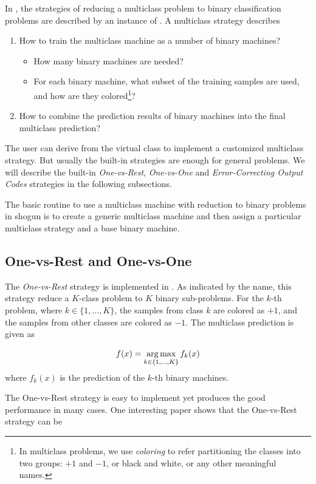 In \shogun{}, the strategies of reducing a multiclass problem to binary
classification problems are described by an instance of
. A multiclass strategy describes
\begin{enumerate}
\item How to train the multiclass machine as a number of binary machines?
	\begin{itemize}
		\item How many binary machines are needed?
		\item For each binary machine, what subset of the training samples are
			used, and how are they colored\footnote{In multiclass problems, we
				use \emph{coloring} to refer partitioning the classes into two
				groups: $+1$ and $-1$, or black and white, or any other meaningful
				names.}?
	\end{itemize}
\item How to combine the prediction results of binary machines into the final
	multiclass prediction?
\end{enumerate}

The user can derive from the virtual class  to
implement a customized multiclass strategy. But usually the built-in strategies
are enough for general problems. We will describe the built-in \emph{One-vs-Rest},
\emph{One-vs-One} and \emph{Error-Correcting Output Codes} strategies in the
following subsections.

The basic routine to use a multiclass machine with reduction to binary problems
in shogun is to create a generic multiclass machine and then assign a particular
multiclass strategy and a base binary machine.

\subsection{One-vs-Rest and One-vs-One}

The \emph{One-vs-Rest} strategy is implemented in
. As indicated by the name, this
strategy reduce a $K$-class problem to $K$ binary sub-problems. For the $k$-th
problem, where $k\in\{1,\ldots,K\}$, the samples from class $k$ are colored as
$+1$, and the samples from other classes are colored as $-1$. The multiclass
prediction is given as

\[
	f(x) = \operatorname*{arg\,max}_{k\in\{1,\ldots,K\}} f_k(x)
\]
where $f_k(x)$ is the prediction of the $k$-th binary machines.

The One-vs-Rest strategy is easy to implement yet produces the good performance
in many cases. One interesting paper \citep{OneVsRestDefense} shows that the
One-vs-Rest strategy can be


